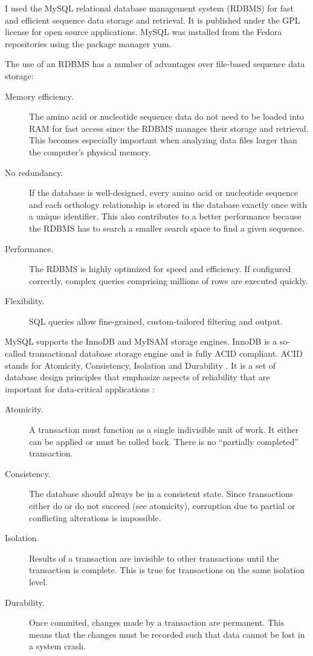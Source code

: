 \label{sec:mysql}
I used the MySQL relational database management system (RDBMS) for fast and
efficient sequence data storage and retrieval. It is published under the GPL
license for open source applications. MySQL was installed from the Fedora
repositories using the package manager yum.

The use of an RDBMS has a number of advantages over file-based sequence data
storage:

\begin{description}
	\item[Memory efficiency.] The amino acid or nucleotide sequence data do not
		need to be loaded into RAM for fast access since the RDBMS manages their
		storage and retrieval.  This becomes especially important when analyzing data
		files larger than the computer's physical memory.
	\item[No redundancy.] If the database is well-designed, every amino acid or
		nucleotide sequence and each orthology relationship is stored in the database
		exactly once with a unique identifier. This also contributes to a better
		performance because the RDBMS has to search a smaller search space to find a
		given sequence.
	\item[Performance.] The RDBMS is highly optimized for speed and efficiency. If
		configured correctly, complex queries comprising millions of rows are
		executed quickly.
	\item[Flexibility.] SQL queries allow fine-grained, custom-tailored filtering
		and output.
\end{description}

MySQL supports the InnoDB \citep{mysql2013} and MyISAM \citep{mysql2013} storage
engines. InnoDB is a so-called transactional database storage engine and is
fully ACID compliant. ACID stands for Atomicity, Consistency, Isolation and
Durability \citep{haerder1983}. It is a set of database design principles that
emphasize aspects of reliability that are important for data-critical
applications \citep{schwartz2012}:

\begin{description}
	\item[Atomicity.] A transaction must function as a single indivisible unit of
		work. It either can be applied or must be rolled back. There is no
		``partially completed'' transaction.
	\item[Consistency.] The database should always be in a consistent state. Since
		transactions either do or do not succeed (see atomicity), corruption due to
		partial or conflicting alterations is impossible.
	\item[Isolation.] Results of a transaction are invisible to other
		transactions until the transaction is complete. This is true for
		transactions on the same isolation level.
	\item[Durability.] Once commited, changes made by a transaction are permanent.
		This means that the changes must be recorded such that data cannot be lost
		in a system crash. 
\end{description}

